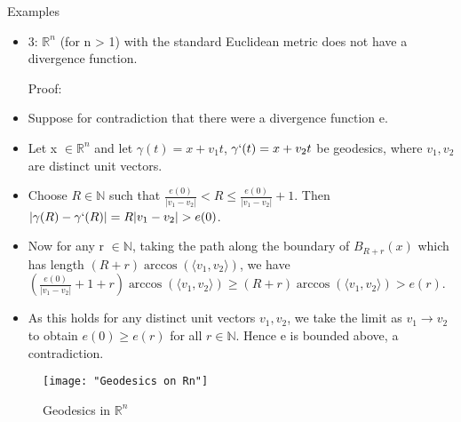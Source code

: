 \documentclass[11pt]{beamer}
\newcommand{\vs}{\vskip10pt}
\begin{document}
	\begin{frame}{Examples}
		
		\begin{itemize}
			
		
			
			\item 3: $\mathbb{R}^n$ (for n > 1) with the standard Euclidean metric does not have a divergence function. 
			\vs
			
			Proof: 
			
			\item Suppose for contradiction that there were a divergence function e. 
			
			\item Let x $\in \mathbb{R}^n$ and let $\gamma(t) = x + v_1t$, $\gamma`(t) = x + v_2t$ be geodesics, where $v_1, v_2 $ are distinct unit vectors. 
			
			\item Choose $R \in \mathbb{N}$ such that $\frac{e(0)}{\vert v_1 - v_2 \vert } < R \leq \frac{e(0)}{\vert v_1 - v_2 \vert } + 1$. Then $\vert \gamma(R) - \gamma`(R) \vert = R \vert v_1 - v_2 \vert > e(0)$. 
			
			\item Now for any r $\in \mathbb{N}$, taking the path along the boundary of $B_{R+r}(x)$ which has length $(R+r) \arccos(\langle v_1, v_2 \rangle)$, we have $(\frac{e(0)}{\vert v_1 - v_2 \vert} + 1 + r)\arccos(\langle v_1, v_2 \rangle) \geq (R+r)\arccos(\langle v_1, v_2 \rangle) > e(r)$. 
			
			\item As this holds for any distinct unit vectors $v_1, v_2$, we take the limit as $v_1 \rightarrow v_2$ to obtain $e(0) \geq e(r)$ for all $r \in \mathbb{N}$. Hence e is bounded above, a contradiction. 
			
			
		\end{itemize}
		
	\end{frame}
	
	\begin{frame}
		
\begin{figure}
	\centering
	\texttt{[image: "Geodesics on Rn"]}
	\caption{Geodesics in $\mathbb{R}^n$}
	\label{fig:geodesics-on-rn}
\end{figure}
		
	\end{frame}
	
\end{document}
